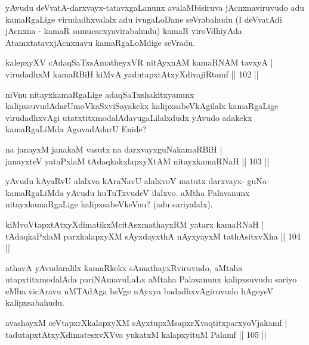 \begin{artha}
yAvudu deVvatA-darxvayx-tatavxgaLanunx avalaMbisiruva jAcnxna\-\break viruvudo adu kamaRgaLige virudadhxvalalx adu ivugaLoDane seVrabahudu (I deVvatAdi jAcnxna - kamaR samucacxyavirabahudu) kamaR viroVdhiyAda AtamxtatavxjAcnxnavu kamaRgaLoMdige seVradu.
\end{artha}

\begin{shl}
kalepxyXV cAdaqSaTxsAmatheyxVR nitAyxnAM kamaRNAM tavxyA |\\
virudadhxM kamaRBiH kiMvA yadutapxtAtxyXdivajiRtamf \hfill || 102 ||
\end{shl}

\begin{artha}
niVnu nitayxkamaRgaLige adaqSaTxshakitxyanunx kalipxsuvudAdarU\break moVkaSxviSayakekx kalipxsabeVkAgilalx kamaRgaLige virudadhxvAgi utatxtitxmodalAdavugaLilalxdudx yAvudo adakekx kamaRgaLiMda AguvadAdarU Enide?
\end{artha}

\begin{shl}
na janayxM janakaM vasutx na darxvayxguNakamaRBiH |\\
janayxteV yataPxlaM tAdaqkakxlapxyXtAM nitayxkamaRNaH \hfill || 103 ||
\end{shl}

\begin{artha}
yAvudu kAyaRvU alalxvo kAraNavU alalxvoV matutx darxvayx- guNa-kamaRgaLiMda yAvudu huTuTxvudeV ilalxvo. aMtha Palavanunx nitayxkamaRgaLige kalipxsabeVkeVnu? (adu sariyalalx).
\end{artha}

\begin{shl}
kiMvoVtapxtAtxyXdimatikxMcitAsxmathayxRM yatarx kamaRNaH |\\
tAdaqkaPxlaM parxkalapxyXM sAyxdayxthA nAyxyayxM tathA\s sitxvXha \hfill || 104 ||
\end{shl}

\begin{artha}
athavA yAvudaralilx kamaRkekx sAmathayxRviruvudo, aMtaha utapxtitxmodalAda pariNAmavuLaLx aMtaha Palavanunx kalipxsuvudu sariyo eMba vicAravu uMTAdAga heVge nAyxya badadhxvAgiruvudo hAgeyeV kalipxsabahudu. 
\end{artha}


\begin{shl}
avashayxM ceVtapxrXkalapxyXM sAyxtupxMsapxrXvaqtitxparxyoVjakamf |\\
tadutapxtAtxyXdimatesxvXVva yukatxM kalapxyituM Palamf \hfill || 105 ||
\end{shl}

